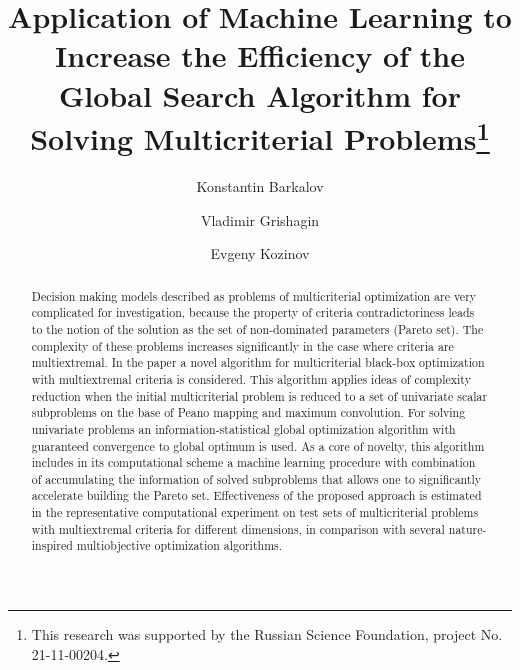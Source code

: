 \documentclass[runningheads]{llncs}
\begin{document}
%
\title{Application of Machine Learning to Increase the Efficiency of the Global Search Algorithm for Solving Multicriterial Problems\thanks{This research was supported by the Russian Science Foundation, project No. 21-11-00204.}}
%
%
\author{Konstantin Barkalov \Letter {} \and
Vladimir Grishagin \and
Evgeny Kozinov}
%
%

%
\maketitle              %
%
	\begin{abstract}
Decision making models described as problems of multicriterial optimization are very complicated for investigation, because the property of criteria contradictoriness leads to the notion of the solution as the set of non-dominated parameters (Pareto set). The complexity of these problems increases significantly in the case where criteria are multiextremal.
In the paper a novel algorithm for multicriterial black-box optimization with multiextremal criteria is considered. This algorithm applies ideas of complexity reduction when the initial multicriterial problem is reduced to a set of univariate scalar subproblems on the base of Peano mapping and maximum convolution. For solving univariate problems an information-statistical global optimization algorithm with guaranteed convergence to global optimum is used. As a core of novelty, this algorithm includes in its computational scheme a machine learning procedure with combination of accumulating the information of solved subproblems that allows one to significantly accelerate building the Pareto set.
Effectiveness of the proposed approach is estimated in the representative computational experiment on test sets of multicriterial problems with multiextremal criteria for different dimensions, in comparison with several nature-inspired multiobjective optimization algorithms.


\end{abstract}
%
%
%
\end{document}
